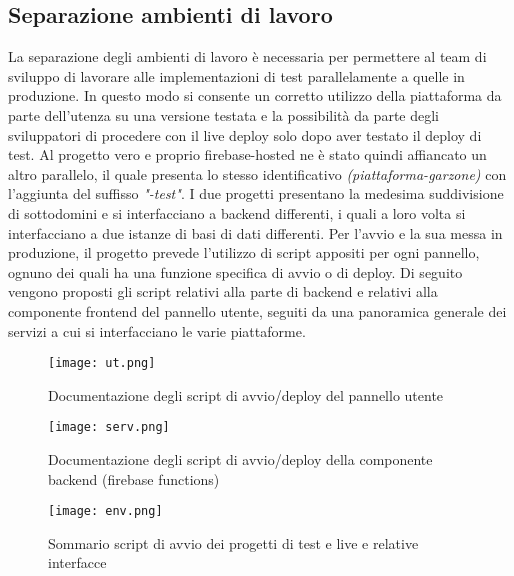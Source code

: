 \subsection{Separazione ambienti di lavoro}
La separazione degli ambienti di lavoro è necessaria per permettere al team di sviluppo di lavorare alle implementazioni di test parallelamente a quelle in produzione. In questo modo si consente un corretto utilizzo della piattaforma da parte dell'utenza su una versione testata e la possibilità da parte degli sviluppatori di procedere con il live deploy solo dopo aver testato il deploy di test. Al progetto vero e proprio firebase-hosted ne è stato quindi affiancato un altro parallelo, il quale presenta lo stesso identificativo \textit{(piattaforma-garzone)} con l'aggiunta del suffisso \textit{"-test"}. I due progetti presentano la medesima suddivisione di sottodomini e si interfacciano a backend differenti, i quali a loro volta si interfacciano a due istanze di basi di dati differenti.
Per l'avvio e la sua messa in produzione, il progetto prevede l'utilizzo di script appositi per ogni pannello, ognuno dei quali ha una funzione specifica di avvio o di deploy. Di seguito vengono proposti gli script relativi alla parte di backend e relativi alla componente frontend del pannello utente, seguiti da una panoramica generale dei servizi a cui si interfacciano le varie piattaforme.
\begin{figure}[!htb]
    \centering
    \texttt{[image: ut.png]}
    \caption{Documentazione degli script di avvio/deploy del pannello utente}
\end{figure}
\begin{figure}[!htb]
    \centering
    \texttt{[image: serv.png]}
    \caption{Documentazione degli script di avvio/deploy della componente backend (firebase functions)}
\end{figure}

\begin{figure}[!htb]
    \centering
    \texttt{[image: env.png]}
    \caption{Sommario script di avvio dei progetti di test e live e relative interfacce}
\end{figure}

